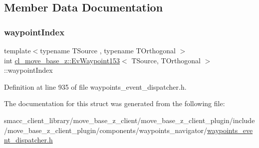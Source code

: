 \subsection{Member Data Documentation}
\mbox{\label{structcl__move__base__z_1_1EvWaypoint153_a95d99ff639ddc67d453ae4caddf5d175}} 
\subsubsection{\texorpdfstring{waypoint\+Index}{waypointIndex}}
{\footnotesize\ttfamily template$<$typename T\+Source , typename T\+Orthogonal $>$ \\
int \hyperlink{structcl__move__base__z_1_1EvWaypoint153}{cl\+\_\+move\+\_\+base\+\_\+z\+::\+Ev\+Waypoint153}$<$ T\+Source, T\+Orthogonal $>$\+::waypoint\+Index}



Definition at line 935 of file waypoints\+\_\+event\+\_\+dispatcher.\+h.



The documentation for this struct was generated from the following file\+:\begin{DoxyCompactItemize}
\item 
smacc\+\_\+client\+\_\+library/move\+\_\+base\+\_\+z\+\_\+client/move\+\_\+base\+\_\+z\+\_\+client\+\_\+plugin/include/move\+\_\+base\+\_\+z\+\_\+client\+\_\+plugin/components/waypoints\+\_\+navigator/\hyperlink{waypoints__event__dispatcher_8h}{waypoints\+\_\+event\+\_\+dispatcher.\+h}\end{DoxyCompactItemize}
